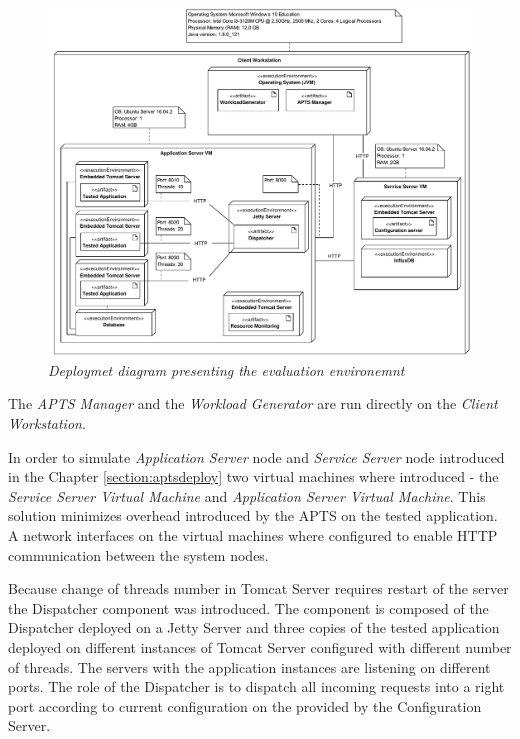 \documentclass[12pt,a4paper]{article}
\begin{document}
\begin{figure}[!htb]
\centering
\includegraphics[width=1\textwidth]{ExperimentsEnvironemtDiagram}
\caption{\textit{Deploymet diagram presenting the evaluation environemnt}} \label{figure:deployment:evaluation}
\end{figure}

The \textit{APTS Manager} and the \textit{Workload Generator} are run directly on the \textit{Client Workstation}. 

In order to simulate \textit{Application Server} node and \textit{Service Server} node introduced in the Chapter \ref{section:aptsdeploy} two virtual machines where introduced - the \textit{Service Server Virtual Machine} and \textit{Application Server Virtual Machine}. This solution minimizes overhead introduced by the APTS on the tested application. A network interfaces on the virtual machines where configured to enable HTTP communication between the system nodes. 

Because change of threads number in Tomcat Server requires restart of the server the Dispatcher component was introduced. The component is composed of the Dispatcher deployed on a Jetty Server and three copies of the tested application deployed on different instances of Tomcat Server configured with different number of threads. The servers with the application instances are listening on different ports. The role of the Dispatcher is to dispatch all incoming requests into a right port according to current configuration on the provided by the Configuration Server.
\end{document}
